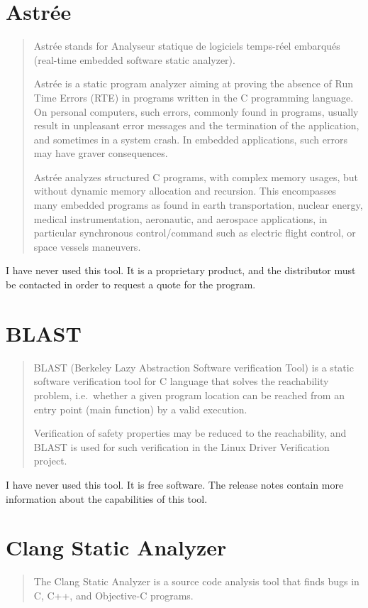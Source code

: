 \documentclass[12pt]{article}
\begin{document}
\section{Astrée}
\begin{quote}
Astrée stands for Analyseur statique
de logiciels temps-réel embarqués (real-time embedded software static
analyzer).

Astrée is a static program analyzer aiming at proving the absence of Run
Time Errors (RTE) in programs written in the C programming language.
On personal computers, such errors, commonly found in programs, usually
result in unpleasant error messages and the termination of the application,
and sometimes in a system crash. In embedded applications, such errors may
have graver consequences.

Astrée analyzes structured C programs, with complex memory usages, but
without dynamic memory allocation and recursion. This encompasses many
embedded programs as found in earth transportation, nuclear energy,
medical instrumentation, aeronautic, and aerospace applications, in
particular synchronous control/command such as electric flight control,
or space vessels maneuvers.
\end{quote}

I have never used this tool. It is a proprietary product, and the distributor
must be contacted in order to request a quote for the program.

\cite{astree}
\section{BLAST}
\begin{quote}
BLAST (Berkeley Lazy Abstraction Software verification Tool) is a static
software verification tool for C language that solves the reachability
problem, i.e.\ whether a given program location can be reached from an
entry point (main function) by a valid execution.

Verification of safety properties may be reduced to the reachability,
and BLAST is used for such verification in the Linux Driver Verification
project.
\end{quote}

I have never used this tool. It is free software. The release notes
contain more information about the capabilities of this tool.

\cite{blast}
\section{Clang Static Analyzer}
\begin{quote}
The Clang Static Analyzer is a source code analysis tool that finds bugs
in C, C++, and Objective-C programs.
\end{quote}
\end{document}
